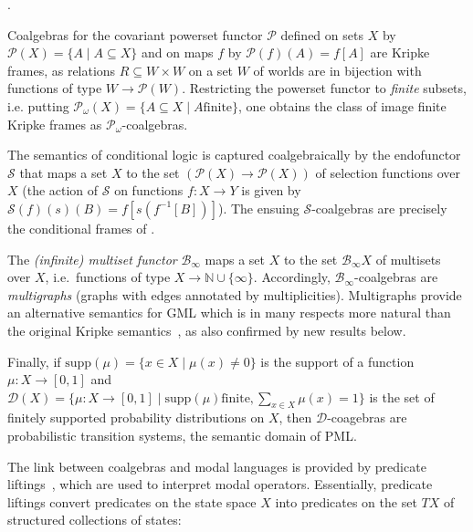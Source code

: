 \documentclass[proceedings]{stacs}
\theoremstyle{definition}
\theoremstyle{plain}
\newcommand{\Pow}{\mathcal{P}}
\newcommand{\Nat}{{\mathbb{N}}}
\newcommand{\Baginfty}{\mathcal{B}_\infty}
\newcommand{\Sel}{\mathcal{S}}
\newcommand{\supp}{\mathrm{supp}}
\newcommand{\Dist}{\mathcal{D}}
\newcommand{\inv}{^{-1}}
\newcounter{blubber}
\newenvironment{sparenumerate}
{\begin{list}
  {\arabic{blubber}.}
  {\usecounter{blubber}
   \setlength{\leftmargin}{0pt}
    \setlength{\parsep}{0pt}
    \setlength{\itemindent}{3ex}
    \setlength{\itemsep}{2pt}   
    \setlength{\listparindent}{3ex}
  }
}
{\end{list}}
\begin{document}
\begin{exas}\label{expl:coalgml}
\begin{sparenumerate}
\item \label{item:Kripke} Coalgebras for the covariant powerset
  functor $\Pow$ defined on sets $X$ by $\Pow(X) = \lbrace A \mid A
  \subseteq X \rbrace$ and on maps $f$ by $\Pow(f)(A)=f[A]$ are Kripke
  frames, as relations $R \subseteq W \times W$ on a set $W$ of worlds
  are in bijection with functions of type $W \to \Pow(W)$.
  Restricting the powerset functor to \emph{finite} subsets,
  i.e. putting $\Pow_\omega(X) = \lbrace A \subseteq X \mid A \mbox{
    finite} \rbrace$, one obtains the class of image finite Kripke
  frames as $\Pow_{\omega}$-coalgebras. 
\item\label{item:cond} The semantics of conditional logic is captured
  coalgebraically by the endofunctor $\Sel$ that maps a set $X$ to the
  set $(\Pow(X) \to \Pow(X))$ of selection functions over $X$ (the
  action of $\Sel$ on functions $f: X \to Y$ is given by
  $\Sel(f)(s)(B) = f [ s(f\inv[B])]$).  The ensuing $\Sel$-coalgebras
  are precisely the conditional frames of \cite{Chellas80}.
\item\label{item:gml} The \emph{(infinite) multiset functor}
  $\Baginfty$ maps a set $X$ to the set $\Baginfty X$ of multisets
  over $X$, i.e.\ functions of type $X \to \Nat \cup \lbrace \infty
  \rbrace$.
Accordingly, $\Baginfty$-coalgebras are \emph{multigraphs} (graphs
  with edges annotated by multiplicities). Multigraphs provide an
  alternative semantics for GML which is in many
  respects more natural than the original Kripke
  semantics~\cite{DAgostinoVisser02}, as also confirmed by new
  results below.
\item\label{item:pml} Finally, if $\supp(\mu) = \lbrace x \in X \mid
  \mu(x) \neq 0 \rbrace$ is the support of a function $\mu: X \to [0,
  1]$ and $\Dist(X) = \lbrace \mu: X \to [0, 1] \mid \supp(\mu) \mbox{
    finite}, \sum_{x \in X} \mu(x) = 1 \rbrace$ is the set of finitely
  supported probability distributions on $X$, then $\Dist$-coagebras
  are probabilistic transition systems, the semantic domain of
  PML.
\end{sparenumerate}
\end{exas}
\noindent The link between coalgebras and modal languages is provided
by predicate liftings~\cite{Pattinson03}, which are used to interpret
modal operators. Essentially, predicate liftings convert predicates on
the state space $X$ into predicates on the set $TX$ of structured
collections of states:
\end{document}
